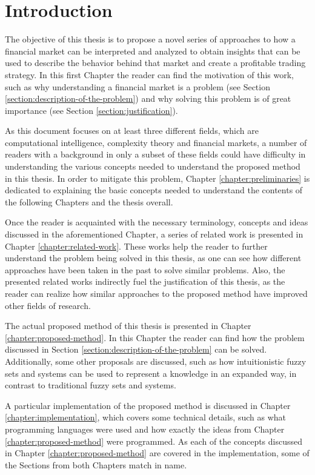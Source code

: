 \chapter{Introduction}
\label{chapter:introduction}

The objective of this thesis is to propose a novel series of approaches to how a financial market can be interpreted and analyzed to obtain insights that can be used to describe the behavior behind that market and create a profitable trading strategy. In this first Chapter the reader can find the motivation of this work, such as why understanding a financial market is a problem (see Section \ref{section:description-of-the-problem}) and why solving this problem is of great importance (see Section \ref{section:justification}).

As this document focuses on at least three different fields, which are computational intelligence, complexity theory and financial markets, a number of readers with a background in only a subset of these fields could have difficulty in understanding the various concepts needed to understand the proposed method in this thesis. In order to mitigate this problem, Chapter \ref{chapter:preliminaries} is dedicated to explaining the basic concepts needed to understand the contents of the following Chapters and the thesis overall.

Once the reader is acquainted with the necessary terminology, concepts and ideas discussed in the aforementioned Chapter, a series of related work is presented in Chapter \ref{chapter:related-work}. These works help the reader to further understand the problem being solved in this thesis, as one can see how different approaches have been taken in the past to solve similar problems. Also, the presented related works indirectly fuel the justification of this thesis, as the reader can realize how similar approaches to the proposed method have improved other fields of research.

The actual proposed method of this thesis is presented in Chapter \ref{chapter:proposed-method}. In this Chapter the reader can find how the problem discussed in Section \ref{section:description-of-the-problem} can be solved. Additionally, some other proposals are discussed, such as how intuitionistic fuzzy sets and systems can be used to represent a knowledge in an expanded way, in contrast to traditional fuzzy sets and systems.

A particular implementation of the proposed method is discussed in Chapter \ref{chapter:implementation}, which covers some technical details, such as what programming languages were used and how exactly the ideas from Chapter \ref{chapter:proposed-method} were programmed. As each of the concepts discussed in Chapter \ref{chapter:proposed-method} are covered in the implementation, some of the Sections from both Chapters match in name.

